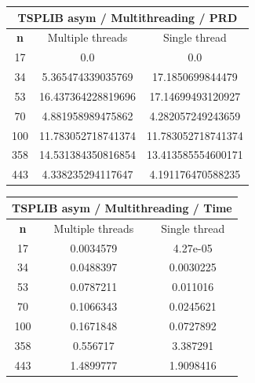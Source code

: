 \documentclass{article}
\begin{document}
\begin{center}
\begin{tabular}{|c|c|c|}
\hline
\multicolumn{3}{|c|}{\textbf{TSPLIB asym / Multithreading / PRD}}\\
\hline
\textbf{n} & Multiple threads & Single thread\\
\hline
17 & 0.0 & 0.0\\
\hline
34 & 5.365474339035769 & 17.1850699844479\\
\hline
53 & 16.437364228819696 & 17.14699493120927\\
\hline
70 & 4.881958989475862 & 4.282057249243659\\
\hline
100 & 11.783052718741374 & 11.783052718741374\\
\hline
358 & 14.531384350816854 & 13.413585554600171\\
\hline
443 & 4.338235294117647 & 4.191176470588235\\
\hline
\end{tabular}
\end{center}


\begin{center}
\begin{tabular}{|c|c|c|}
\hline
\multicolumn{3}{|c|}{\textbf{TSPLIB asym / Multithreading / Time}}\\
\hline
\textbf{n} & Multiple threads & Single thread\\
\hline
17 & 0.0034579 & 4.27e-05\\
\hline
34 & 0.0488397 & 0.0030225\\
\hline
53 & 0.0787211 & 0.011016\\
\hline
70 & 0.1066343 & 0.0245621\\
\hline
100 & 0.1671848 & 0.0727892\\
\hline
358 & 0.556717 & 3.387291\\
\hline
443 & 1.4899777 & 1.9098416\\
\hline
\end{tabular}
\end{center}
\end{document}
